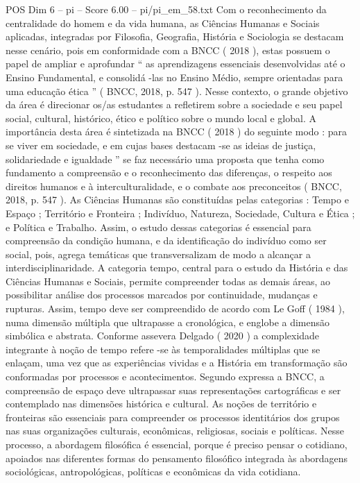 \begin{textsample}{POS Dim 6 – pi – Score 6.00 – pi/pi\_em\_58.txt}
Com o reconhecimento da centralidade do homem e da vida humana, as Ciências Humanas e Sociais aplicadas, integradas por Filosofia, Geografia, História e Sociologia se destacam nesse cenário, pois em conformidade com a BNCC ( 2018 ), estas possuem o papel de ampliar e aprofundar “ as aprendizagens essenciais desenvolvidas até o Ensino Fundamental, e consolidá -las no Ensino Médio, sempre orientadas para uma educação ética ” ( BNCC, 2018, p. 547 ).
Nesse contexto, o grande objetivo da área é direcionar os/as estudantes a refletirem sobre a sociedade e seu papel social, cultural, histórico, ético e político sobre o mundo local e global.
A importância desta área é sintetizada na BNCC ( 2018 ) do seguinte modo : para se viver em sociedade, e em cujas bases destacam -se as ideias de justiça, solidariedade e igualdade ” se faz necessário uma proposta que tenha como fundamento a compreensão e o reconhecimento das diferenças, o respeito aos direitos humanos e à interculturalidade, e o combate aos preconceitos ( BNCC, 2018, p. 547 ).
As Ciências Humanas são constituídas pelas categorias : Tempo e Espaço ; Território e Fronteira ; Indivíduo, Natureza, Sociedade, Cultura e Ética ; e Política e Trabalho.
Assim, o estudo dessas categorias é essencial para compreensão da condição humana, e da identificação do indivíduo como ser social, pois, agrega temáticas que transversalizam de modo a alcançar a interdisciplinaridade.
A categoria tempo, central para o estudo da História e das Ciências Humanas e Sociais, permite compreender todas as demais áreas, ao possibilitar análise dos processos marcados por continuidade, mudanças e rupturas.
Assim, tempo deve ser compreendido de acordo com Le Goff ( 1984 ), numa dimensão múltipla que ultrapasse a cronológica, e englobe a dimensão simbólica e abstrata.
Conforme assevera Delgado ( 2020 ) a complexidade integrante à noção de tempo refere -se às temporalidades múltiplas que se enlaçam, uma vez que as experiências vividas e a História em transformação são conformadas por processos e acontecimentos.
Segundo expressa a BNCC, a compreensão de espaço deve ultrapassar suas representações cartográficas e ser contemplado nas dimensões histórica e cultural.
As noções de território e fronteiras são essenciais para compreender os processos identitários dos grupos nas suas organizações culturais, econômicas, religiosas, sociais e políticas.
Nesse processo, a abordagem filosófica é essencial, porque é preciso pensar o cotidiano, apoiados nas diferentes formas do pensamento filosófico integrada às abordagens sociológicas, antropológicas, políticas e econômicas da vida cotidiana.

\end{textsample}
